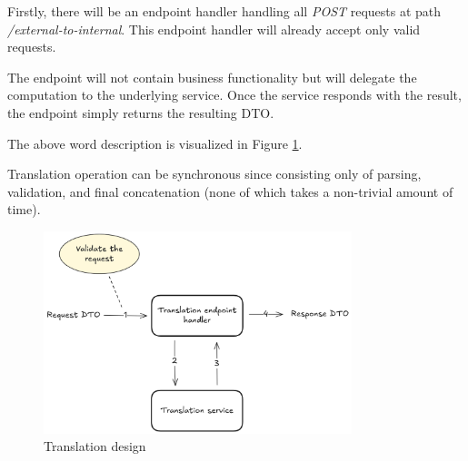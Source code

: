 \documentclass[../main.tex]{subfiles}
\begin{document}
Firstly, there will be an endpoint handler handling all \textit{POST} requests at path \textit{/external-to-internal}. This endpoint handler will already accept only valid requests.

The endpoint will not contain business functionality but will delegate the computation to the underlying service. Once the service responds with the result, the endpoint simply returns the resulting DTO.

The above word description is visualized in Figure \ref{fig:translation-design}.

Translation operation can be synchronous since consisting only of parsing, validation, and final concatenation (none of which takes a non-trivial amount of time).

\begin{figure}
  \begin{center}
    \includegraphics[width=0.8\textwidth]{images/translation-design.png}
  \end{center}
  \caption{Translation design}
  \label{fig:translation-design}
\end{figure}
\end{document}
